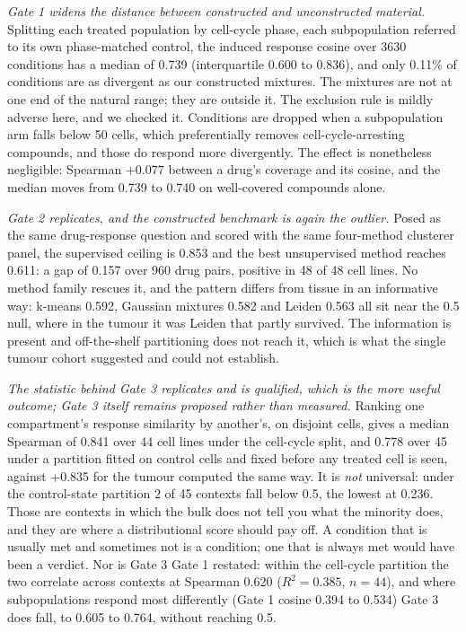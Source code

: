 \documentclass[11pt,letterpaper]{article}
\newcommand{\TAHOECONDS}{3630}
\newcommand{\TAHOEGONE}{0.739}
\newcommand{\TAHOEGONEQ}{0.600 to 0.836}
\newcommand{\TAHOEBELOWMIX}{0.11}
\newcommand{\TAHOEGTWOCEIL}{0.853}
\newcommand{\TAHOEGTWOUNSUP}{0.611}
\newcommand{\TAHOEGTWOGAP}{0.157}
\newcommand{\TAHOEGTWOPAIRS}{960}
\newcommand{\TAHOEGTWOLINES}{48}
\newcommand{\TAHOEGTWOLINESPOS}{48}
\newcommand{\TAHOEKMEANS}{0.592}
\newcommand{\TAHOEGMM}{0.582}
\newcommand{\TAHOELEIDEN}{0.563}
\newcommand{\TAHOEGTHREECC}{0.841}
\newcommand{\TAHOEGTHREECCN}{44}
\newcommand{\TAHOEGTHREEST}{0.778}
\newcommand{\TAHOEGTHREESTN}{45}
\newcommand{\TAHOEGTHREESTOPEN}{2}
\newcommand{\TAHOEGTHREESTMIN}{0.236}
\newcommand{\TAHOECOUPLING}{0.620}
\newcommand{\TAHOECOUPLINGRSQ}{0.385}
\newcommand{\TAHOECOUPLINGN}{44}
\newcommand{\TAHOEOPENGONE}{0.394 to 0.534}
\newcommand{\TAHOEOPENGTHREE}{0.605 to 0.764}
\newcommand{\PREMISEDISJOINT}{+0.835}
\begin{document}
\emph{Gate 1 widens the distance between constructed and unconstructed material.} Splitting each
treated population by cell-cycle phase, each subpopulation referred to its own phase-matched
control, the induced response cosine over \TAHOECONDS{} conditions has a median of \TAHOEGONE{}
(interquartile \TAHOEGONEQ{}), and only \TAHOEBELOWMIX{}\% of conditions are as divergent as our
constructed mixtures. The mixtures are not at one end of the natural range; they are outside it.
The exclusion rule is mildly adverse here, and we checked it. Conditions are dropped when a
subpopulation arm falls below 50 cells, which preferentially removes cell-cycle-arresting
compounds, and those do respond more divergently. The effect is nonetheless negligible: Spearman
$+0.077$ between a drug's coverage and its cosine, and the median moves from \TAHOEGONE{} to 0.740
on well-covered compounds alone.

\emph{Gate 2 replicates, and the constructed benchmark is again the outlier.} Posed as the same
drug-response question and scored with the same four-method clusterer panel, the supervised
ceiling is \TAHOEGTWOCEIL{} and the best unsupervised method reaches \TAHOEGTWOUNSUP{}: a gap of
\TAHOEGTWOGAP{} over \TAHOEGTWOPAIRS{} drug pairs, positive in \TAHOEGTWOLINESPOS{} of
\TAHOEGTWOLINES{} cell lines. No method family rescues it, and the pattern differs from tissue in
an informative way: k-means \TAHOEKMEANS{}, Gaussian mixtures \TAHOEGMM{} and Leiden
\TAHOELEIDEN{} all sit near the 0.5 null, where in the tumour it was Leiden that partly survived.
The information is present and off-the-shelf partitioning does not reach it, which is what the
single tumour cohort suggested and could not establish.

\emph{The statistic behind Gate 3 replicates and is qualified, which is the more useful outcome;
Gate 3 itself remains proposed rather than measured.} Ranking one
compartment's response similarity by another's, on disjoint cells, gives a median Spearman of
\TAHOEGTHREECC{} over \TAHOEGTHREECCN{} cell lines under the cell-cycle split, and
\TAHOEGTHREEST{} over \TAHOEGTHREESTN{} under a partition fitted on control cells and fixed before
any treated cell is seen, against \PREMISEDISJOINT{} for the tumour computed the same way. It is
\emph{not} universal: under the control-state partition \TAHOEGTHREESTOPEN{} of
\TAHOEGTHREESTN{} contexts fall below 0.5, the lowest at \TAHOEGTHREESTMIN{}. Those are contexts
in which the bulk does not tell you what the minority does, and they are where a distributional
score should pay off. A condition that is usually met and sometimes not is a condition; one that
is always met would have been a verdict. Nor is Gate 3 Gate 1 restated: within the cell-cycle
partition the two correlate across contexts at Spearman \TAHOECOUPLING{}
($R^2 = \TAHOECOUPLINGRSQ{}$, $n = \TAHOECOUPLINGN{}$), and where subpopulations respond most
differently (Gate 1 cosine \TAHOEOPENGONE{}) Gate 3 does fall, to \TAHOEOPENGTHREE{}, without
reaching 0.5.
\end{document}
